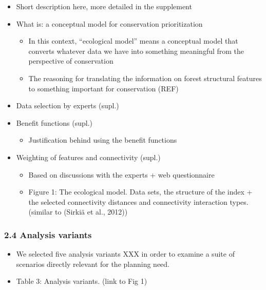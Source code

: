 \documentclass[]{article}
\begin{document}
\begin{itemize}
\itemsep1pt\parskip0pt
\item
  Short description here, more detailed in the supplement
\item
  What is: a conceptual model for conservation prioritization

  \begin{itemize}
  \itemsep1pt\parskip0pt
  \item
    In this context, ``ecological model'' means a conceptual model that
    converts whatever data we have into something meaningful from the
    perspective of conservation
  \item
    The reasoning for translating the information on forest structural
    features to something important for conservation (REF)
  \end{itemize}
\item
  Data selection by experts (supl.)
\item
  Benefit functions (supl.)

  \begin{itemize}
  \itemsep1pt\parskip0pt
  \item
    Justification behind using the benefit functions
  \end{itemize}
\item
  Weighting of features and connectivity (supl.)

  \begin{itemize}
  \itemsep1pt\parskip0pt
  \item
    Based on discussions with the experts + web questionnaire
  \item
    Figure 1: The ecological model. Data sets, the structure of the
    index + the selected connectivity distances and connectivity
    interaction types. (similar to (Sirkiä et al., 2012)⁠)
  \end{itemize}
\end{itemize}

\subsubsection{2.4 Analysis variants}

\begin{itemize}
\itemsep1pt\parskip0pt
\item
  We selected five analysis variants XXX in order to examine a suite of
  scenarios directly relevant for the planning need.
\item
  Table 3: Analysis variants. (link to Fig 1)
\end{itemize}
\end{document}
